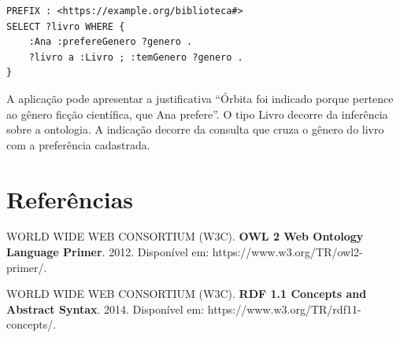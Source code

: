 \documentclass[12pt,a4paper]{article}
\begin{document}
\begin{lstlisting}
PREFIX : <https://example.org/biblioteca#>
SELECT ?livro WHERE {
    :Ana :prefereGenero ?genero .
    ?livro a :Livro ; :temGenero ?genero .
}
\end{lstlisting}

A aplicação pode apresentar a justificativa ``Órbita foi indicado porque pertence ao gênero ficção científica, que Ana prefere''. O tipo Livro decorre da inferência sobre a ontologia. A indicação decorre da consulta que cruza o gênero do livro com a preferência cadastrada.

\section*{Referências}

\noindent [1] WORLD WIDE WEB CONSORTIUM (W3C). \textbf{OWL 2 Web Ontology Language Primer}. 2012. Disponível em: https://www.w3.org/TR/owl2-primer/.

\noindent [2] WORLD WIDE WEB CONSORTIUM (W3C). \textbf{RDF 1.1 Concepts and Abstract Syntax}. 2014. Disponível em: https://www.w3.org/TR/rdf11-concepts/.
\end{document}
